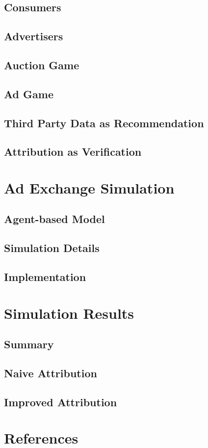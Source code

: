 \documentclass{article}
\begin{document}
\subsection{Consumers}

\subsection{Advertisers}

\subsection{Auction Game}

\subsection{Ad Game}

\subsection{Third Party Data as Recommendation}

\subsection{Attribution as Verification}

\newpage

\section{Ad Exchange Simulation}

\subsection{Agent-based Model}

\subsection{Simulation Details}

\subsection{Implementation}

\newpage

\section{Simulation Results}

\subsection{Summary}

\subsection{Naive Attribution}

\subsection{Improved Attribution}

\section{References}



\end{document}

